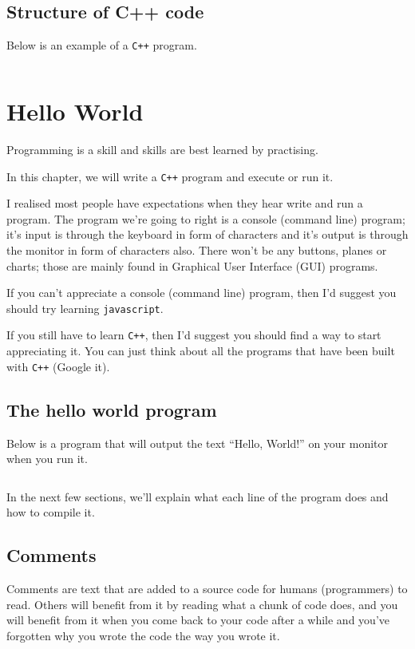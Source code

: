 \documentclass{book}
\begin{document}
\section{Structure of C++ code}
Below is an example of a \verb|C++| program.

\inputminted[linenos, frame=lines, fontsize=\small]{c++}{./csc-201/structure_of_cpp.cpp}

\chapter{Hello World}
Programming is a skill and skills are best learned by practising.

In this chapter, we will write a \verb|C++| program and execute or run it.

I realised most people have expectations when they hear write and run a program. The program we're going to right is a console (command line) program; it's input is through the keyboard in form of characters and it's output is through the monitor in form of characters also. There won't be any buttons, planes or charts; those are mainly found in Graphical User Interface (GUI) programs.

If you can't appreciate a console (command line) program, then I'd suggest you should try learning \verb|javascript|.

If you still have to learn \verb|C++|, then I'd suggest you should find a way to start appreciating it. You can just think about all the programs that have been built with \verb|C++| (Google it).

\section{The hello world program}

Below is a program that will output the text ``Hello, World!'' on your monitor when you run it.

\inputminted[linenos, frame=lines, fontsize=\small]{c++}{./csc-201/3-hello_world.cpp}

In the next few sections, we'll explain what each line of the program does and how to compile it.

\section{Comments}
Comments are text that are added to a source code for humans (programmers) to read. Others will benefit from it by reading what a chunk of code does, and you will benefit from it when you come back to your code after a while and you've forgotten why you wrote the code the way you wrote it.
\end{document}
